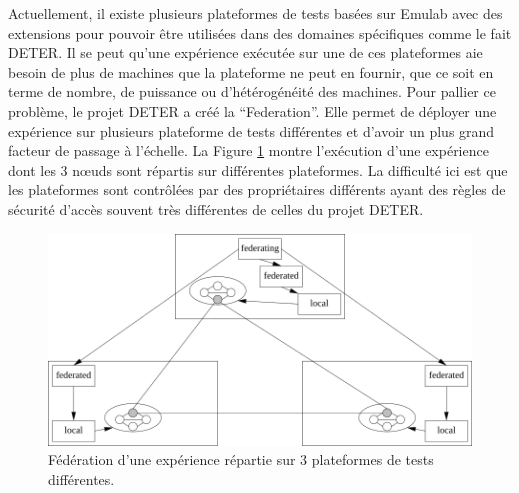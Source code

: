 Actuellement, il existe plusieurs plateformes de tests basées sur Emulab avec
des extensions pour pouvoir être utilisées dans des domaines spécifiques comme
le fait DETER. Il se peut qu'une expérience exécutée sur une de ces plateformes
aie besoin de plus de machines que la plateforme ne peut en fournir, que ce soit
en terme de nombre, de puissance ou d'hétérogénéité des machines. Pour pallier
ce problème, le projet DETER a créé la
``Federation''\citep{DETER_faber2007deter}. Elle permet de déployer une
expérience sur plusieurs plateforme de tests différentes et d'avoir un plus
grand facteur de passage à l'échelle. La Figure \ref{Federation} montre
l'exécution d'une expérience dont les 3 n\oe uds sont répartis sur différentes
plateformes. La difficulté ici est que les plateformes sont contrôlées par des
propriétaires différents ayant des règles de sécurité d'accès souvent très
différentes de celles du projet DETER.

\begin{figure}
  \centering \includegraphics[scale=0.75]{Pictures/png/Deter_federation}
  \caption{Fédération d'une expérience répartie sur 3 plateformes de tests différentes.}
  \label{Federation}
\end{figure}

